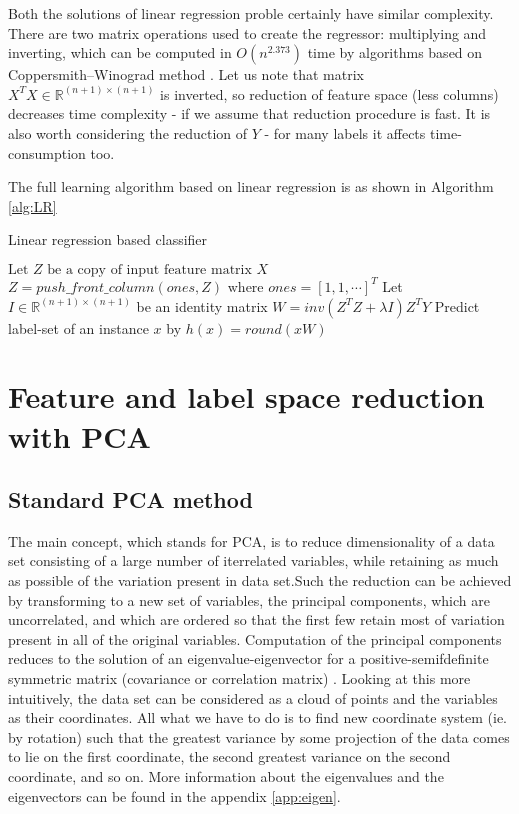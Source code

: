 Both the solutions of linear regression proble certainly have similar complexity. There are two matrix operations used to create the regressor: multiplying and inverting, which can be computed in $O(n^{2.373})$ time by algorithms based on Coppersmith–Winograd method \cite{VVW}. Let us note that matrix $X^TX \in \mathbb{R}^{(n+1) \times (n+1)}$ is inverted, so reduction of feature space (less columns) decreases time complexity - if we assume that reduction procedure is fast. It is also worth considering the reduction of $Y$ - for many labels it affects time-consumption too. 

The full learning algorithm based on linear regression is as shown in Algorithm \ref{alg:LR} 

\begin{algorithm}
    \caption{Linear regression based classifier}\label{alg:LR}
    \begin{algorithmic}[1]
    \State $\text{Let } Z \text{ be a copy of input feature matrix } X$
    \State $Z=push\_front\_column(ones, Z) \text{ where } ones=[1, 1, \cdots]^T$
    \State Let $I \in \mathbb{R}^{(n+1) \times (n+1)}$ be an identity matrix
    \State $W=inv(Z^TZ+\lambda I)Z^TY$
    \State Predict label-set of an instance $x$ by $h(x)=round(xW)$ 
    \end{algorithmic}
\end{algorithm}


\section{Feature and label space reduction with PCA}

\subsection{Standard PCA method}

The main concept, which stands for PCA, is to reduce dimensionality of a data set consisting of a large number of iterrelated variables, while retaining as much as possible of the variation present in data set.Such the reduction can be achieved by transforming to a new set of variables, the principal components, which are uncorrelated, and which are ordered so that the first few retain most of variation present in all of the original variables. Computation of the principal components reduces to the solution of an eigenvalue-eigenvector for a positive-semifdefinite symmetric matrix (covariance or correlation matrix) \cite{Jolliffe}. Looking at this more intuitively, the data set can be considered as a cloud of points and the variables as their coordinates. All what we have to do is to find new coordinate system (ie. by rotation) such that the greatest variance by some projection of the data comes to lie on the first coordinate, the second greatest variance on the second coordinate, and so on. More information about the eigenvalues and the eigenvectors can be found in the appendix \ref{app:eigen}. 

